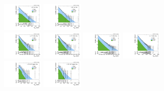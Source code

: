\begin{figure}[htbp]
  \includegraphics[width=0.18\textwidth]{fig/analysisAppendix/PostFit_SR_MVV__mu_LP_bb_HDy_Run2.pdf}
  \includegraphics[width=0.18\textwidth]{fig/analysisAppendix/PostFit_SR_MVV__e_LP_bb_HDy_Run2.pdf}\\
  \includegraphics[width=0.18\textwidth]{fig/analysisAppendix/PostFit_SR_MVV__mu_HP_nobb_HDy_Run2.pdf}
  \includegraphics[width=0.18\textwidth]{fig/analysisAppendix/PostFit_SR_MVV__e_HP_nobb_HDy_Run2.pdf}
  \includegraphics[width=0.18\textwidth]{fig/analysisAppendix/PostFit_SR_MVV__mu_LP_nobb_HDy_Run2.pdf}
  \includegraphics[width=0.18\textwidth]{fig/analysisAppendix/PostFit_SR_MVV__e_LP_nobb_HDy_Run2.pdf}\\
  \includegraphics[width=0.18\textwidth]{fig/analysisAppendix/PostFit_SR_MVV__mu_HP_vbf_HDy_Run2.pdf}
  \includegraphics[width=0.18\textwidth]{fig/analysisAppendix/PostFit_SR_MVV__e_HP_vbf_HDy_Run2.pdf}

\end{figure}
